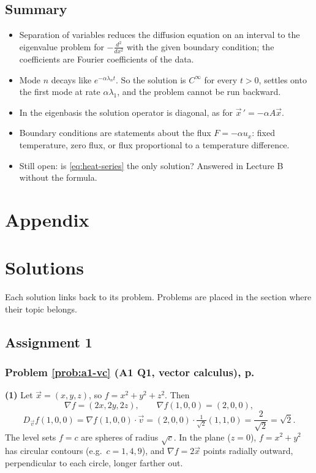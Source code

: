 \documentclass{article}
\begin{document}
\subsection{Summary}
\begin{itemize}
    \item Separation of variables reduces the diffusion equation on an interval to the eigenvalue problem for $-\frac{d^2}{dx^2}$ with the given boundary condition; the coefficients are Fourier coefficients of the data.
    \item Mode $n$ decays like $e^{-\alpha\lambda_nt}$. So the solution is $C^\infty$ for every $t > 0$, settles onto the first mode at rate $\alpha\lambda_1$, and the problem cannot be run backward.
    \item In the eigenbasis the solution operator is diagonal, as for $\vec{x}\,' = -\alpha A\vec{x}$.
    \item Boundary conditions are statements about the flux $F = -\alpha u_x$: fixed temperature, zero flux, or flux proportional to a temperature difference.
    \item Still open: is \eqref{eq:heat-series} the only solution? Answered in Lecture B without the formula.
\end{itemize}

\newpage
\appendix
\section{Appendix}


\section{Solutions}
Each solution links back to its problem. Problems are placed in the section where their topic belongs.

\subsection{Assignment 1}

\label{sol:a1-vc}
\subsubsection*{Problem \ref{prob:a1-vc} (A1 Q1, vector calculus), p.~\pageref{prob:a1-vc}}
\textbf{(1)} Let $\vec{x} = (x,y,z)$, so $f = x^2 + y^2 + z^2$. Then
\begin{equation*}
    \nabla f = (2x, 2y, 2z), \qquad \nabla f(1,0,0) = (2,0,0),
\end{equation*}
\begin{equation*}
    D_{\vec{v}}f(1,0,0) = \nabla f(1,0,0)\cdot\vec{v} = (2,0,0)\cdot\tfrac{1}{\sqrt2}(1,1,0) = \frac{2}{\sqrt2} = \sqrt2.
\end{equation*}
The level sets $f = c$ are spheres of radius $\sqrt c$. In the plane ($z = 0$), $f = x^2 + y^2$ has circular contours (e.g.\ $c = 1, 4, 9$), and $\nabla f = 2\vec{x}$ points radially outward, perpendicular to each circle, longer farther out.
\end{document}
